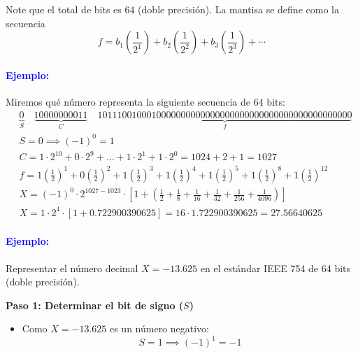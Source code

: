 \documentclass[12pt]{article}
\begin{document}
Note que el total de bits es 64 (doble precisión). La mantisa se define como la secuencia
$$f =  b_1 \left(\frac{1}{2^1}\right) + b_2 \left(\frac{1}{2^2}\right) 
+ b_3 \left(\frac{1}{2^3}\right) + \cdots $$


\paragraph{\textcolor{blue}{Ejemplo:}} Miremos qué número representa la siguiente secuencia de 64 bits:
\begin{align*}
&\underbrace{0}_{S} \quad \underbrace{10000000011}_{C} \quad \underbrace{1011100100010000000000000000000000000000000000000000}_{f} \\[0.5em]
&S = 0 \implies (-1)^0 = 1 \\[0.3em]
&C = 1 \cdot 2^{10} + 0 \cdot 2^9 + \dots + 1 \cdot 2^1 + 1 \cdot 2^0 = 1024 + 2 + 1 = 1027 \\[0.3em]
&f = 1\left(\frac{1}{2}\right)^1 + 0\left(\frac{1}{2}\right)^2 + 1\left(\frac{1}{2}\right)^3 + 1\left(\frac{1}{2}\right)^4 + 1\left(\frac{1}{2}\right)^5 + 1\left(\frac{1}{2}\right)^8 + 1\left(\frac{1}{2}\right)^{12} \\[0.3em]
&X = (-1)^0 \cdot 2^{1027 - 1023} \cdot \left[ 1 + \left( \frac{1}{2} + \frac{1}{8} + \frac{1}{16} + \frac{1}{32} + \frac{1}{256} + \frac{1}{4096} \right) \right] \\[0.3em]
&X = 1 \cdot 2^4 \cdot \left[ 1 + 0.722900390625 \right] = 16 \cdot 1.722900390625 = \mathbf{27.56640625}
\end{align*}

\paragraph{\textcolor{blue}{Ejemplo:}}Representar el número decimal $X = -13.625$ en 
el estándar IEEE 754 de 64 bits (doble precisión).

\vspace{0.5em}

\noindent \textbf{Paso 1: Determinar el bit de signo ($S$)}
\begin{itemize}
    \item Como $X = -13.625$ es un número negativo:
    \[
    S = 1 \implies (-1)^1 = -1
    \]
\end{itemize}
\end{document}
